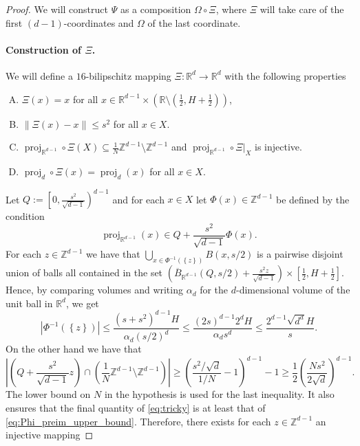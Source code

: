 \documentclass[10pt,a4paper]{amsart}
\DeclareMathOperator{\proj}{proj}
\newcommand{\R}{\mathbb{R}}
\newcommand{\Z}{\mathbb{Z}}
\newcommand{\abs}[1]{\left|#1\right|}
\newcommand{\br}[1]{\left(#1\right)}
\newcommand{\cl}[1]{\overline{#1}}
\newcommand{\enorm}[1]{\left\|#1\right\|}
\newcommand{\set}[1]{\left\{#1\right\}}
\newcommand{\sqbr}[1]{\left[#1\right]}
\begin{document}
\begin{proof}
	We will construct $\Psi$ as a composition $\Omega\circ \Xi$, where $\Xi$ will take care of the first $(d-1)$-coordinates and $\Omega$ of the last coordinate. 
	\paragraph{Construction of $\Xi$.}
	We will define a $16$-bilipschitz mapping $\Xi\colon\R^{d}\to\R^{d}$ with the following properties
	\begin{enumerate}[(A)]
		\item\label{Psi_i} $\Xi(x)=x$ for all $x\in\R^{d-1}\times \br{\R\setminus \br{\frac{1}{2},H+\frac{1}{2}}}$,
		\item\label{Psi_ii} $\enorm{\Xi(x)-x}\leq s^{2}$ for all $x\in X$. 
		\item\label{Psi_iii} $\proj_{\R^{d-1}}\circ \Xi(X)\subseteq \frac{1}{N}\Z^{d-1}\setminus \Z^{d-1}$ and $\proj_{\R^{d-1}}\circ \Xi|_{X}$ is injective.
		\item\label{Psi_iv} $\proj_{d}\circ \Xi(x)=\proj_{d}(x)$ for all $x\in X$.
	\end{enumerate}
	Let $Q:=\left[0,\frac{s^{2}}{\sqrt{d-1}}\right)^{d-1}$ and for each $x\in X$ let $\Phi(x)\in\Z^{d-1}$ be defined by the condition
	\begin{equation*}
	\proj_{\R^{d-1}}(x)\in Q+\frac{s^{2}}{\sqrt{d-1}}\Phi(x).
	\end{equation*}
	For each $z\in\Z^{d-1}$ we have that $\bigcup_{x\in\Phi^{-1}(\set{z})}B(x,s/2)$ is a pairwise disjoint union of balls all contained in the set $\br{\cl{B}_{\R^{d-1}}(Q,s/2)+\frac{s^{2}z}{\sqrt{d-1}}}\times\sqbr{\frac{1}{2},H+\frac{1}{2}}$. Hence, by comparing volumes and writing $\alpha_{d}$ for the $d$-dimensional volume of the unit ball in $\R^{d}$, we get
	\begin{equation}\label{eq:Phi_preim_upper_bound}
	\abs{\Phi^{-1}(\set{z})}\leq \frac{(s+s^{2})^{d-1}H}{\alpha_{d}\br{s/2}^{d}}\leq\frac{(2s)^{d-1}2^{d}H}{\alpha_{d}s^{d}}\leq \frac{2^{d-1}\sqrt{d^{d}}H}{s}.
	\end{equation}
	On the other hand we have that 
	\begin{equation}\label{eq:tricky}
	\abs{\br{Q+\frac{s^{2}}{\sqrt{d-1}}z}\cap \br{\frac{1}{N}\Z^{d-1}\setminus\Z^{d-1}}}\geq \br{\frac{s^{2}/\sqrt{d}}{1/N}-1}^{d-1}-1\geq \frac{1}{2}\br{\frac{Ns^{2}}{2\sqrt{d}}}^{d-1} .
	\end{equation}
	The lower bound on $N$ in the hypothesis is used for the last inequality. It also ensures that the final quantity of \eqref{eq:tricky} is at least that of \eqref{eq:Phi_preim_upper_bound}. Therefore, there exists for each $z\in\Z^{d-1}$ an injective mapping  

\end{proof}
\end{document}
